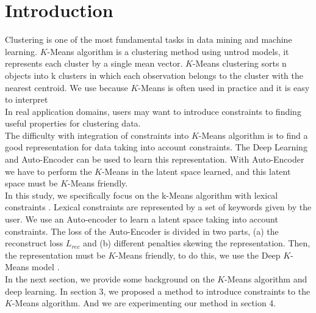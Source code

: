 \section{Introduction}\label{sec:intro}

Clustering is one of the most fundamental tasks in data mining and machine
learning. $K$-Means algorithm is a clustering method using untrod models,
it represents each cluster by a single mean vector. $K$-Means clustering sorts
n objects into k clusters in which each observation belongs to
the cluster with the nearest centroid.
We use because $K$-Means is often used in practice and it is easy to interpret 
\\In real application domains, users may want to introduce constraints to finding 
useful properties for clustering data.
\\The difficulty with integration of constraints into $K$-Means
algorithm is to find a good representation for data  taking into
account constraints. The Deep Learning and Auto-Encoder can be used to
learn this representation. With Auto-Encoder we have to perform the
$K$-Means in the latent space learned, and this latent space must be
$K$-Means friendly.
\\In this study, we specifically focus on the k-Means algorithm with lexical constraints . Lexical constraints are represented
by a set of keywords given by the user. We use an Auto-encoder to learn a latent space taking
into account constraints. The loss of the Auto-Encoder is divided in two parts, (a) 
the reconstruct loss $L_{rec}$ and (b) different penalties skewing the
representation. Then, the representation must be $K$-Means friendly, 
to do this, we use the Deep $K$-Means model \cite{Deap-K-Means}.  
\\In the next section, we provide some background on the $K$-Means algorithm and
deep learning. In section 3, we proposed a method to introduce constraints to 
the $K$-Means algorithm. And we are experimenting our method in section 4.
